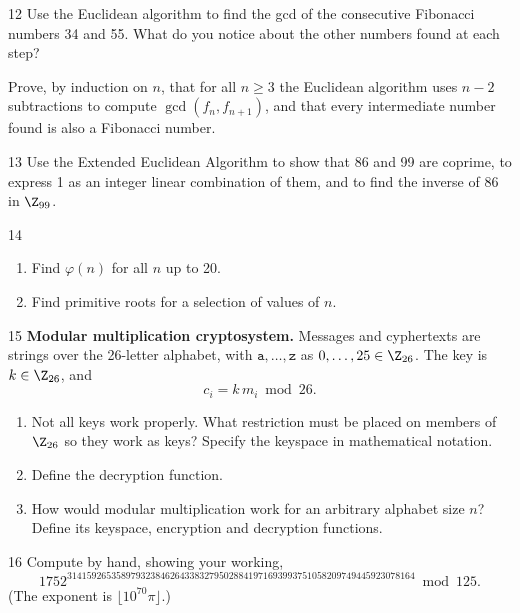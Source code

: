 \begin{exercise}{12}
    Use the Euclidean algorithm to find the gcd of the consecutive Fibonacci
    numbers 34 and 55. What do you notice about the other numbers found at each
    step?

    Prove, by induction on $n$, that for all $n\ge3$ the Euclidean algorithm uses
    $n-2$ subtractions to compute $\gcd(f_n,f_{n+1})$, and that every
    intermediate number found is also a Fibonacci number.
\end{exercise}

\begin{exercise}{13}
    Use the Extended Euclidean Algorithm to show that 86 and 99 are coprime, to
    express 1 as an integer linear combination of them, and to find the inverse
    of 86 in $\Z_{99}$.
\end{exercise}

\begin{exercise}{14}
    \begin{enumerate}[label=(\alph*)]
        \item Find $\varphi(n)$ for all $n$ up to 20.
        \item Find primitive roots for a selection of values of $n$.
    \end{enumerate}
\end{exercise}

\begin{exercise}{15}
    \textbf{Modular multiplication cryptosystem.} Messages and cyphertexts are
    strings over the 26-letter alphabet, with $\mathtt a,\dots,\mathtt z$ as
    $0,\dots,25\in\Z_{26}$. The key is $k\in\Z_{26}$, and
    \[
        c_i = k\,m_i \bmod 26.
    \]
    \begin{enumerate}[label=(\alph*)]
        \item Not all keys work properly. What restriction must be placed on
              members of $\Z_{26}$ so they work as keys? Specify the keyspace in
              mathematical notation.
        \item Define the decryption function.
        \item How would modular multiplication work for an arbitrary alphabet
              size $n$? Define its keyspace, encryption and decryption functions.
    \end{enumerate}
\end{exercise}

\begin{exercise}{16}
    Compute by hand, showing your working,
    \[
        1752^{31415926535897932384626433832795028841971693993751058209749445923078164}
        \bmod 125.
    \]
    (The exponent is $\lfloor10^{70}\pi\rfloor$.)
\end{exercise}

